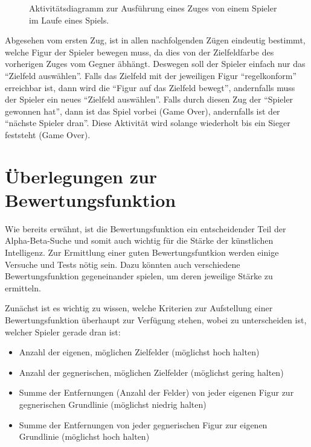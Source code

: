 \documentclass[
	12pt,
	halfparskip,
	a4paper,
	abstract,
	bibliography=totoc,
	liststotoc
]{scrreprt}
\begin{document}
\begin{figure}[htb]
\begin{center}
\end{center}
\caption{Aktivitätsdiagramm zur Ausführung eines Zuges von einem Spieler im Laufe eines Spiels.}
\label{fig:aktiv}
\end{figure}

Abgesehen vom ersten Zug, ist in allen nachfolgenden Zügen eindeutig bestimmt, welche Figur der Spieler bewegen muss, da dies von der Zielfeldfarbe des vorherigen Zuges vom Gegner äbhängt. Deswegen soll der Spieler einfach nur das “Zielfeld auswählen”. Falls das Zielfeld mit der jeweiligen Figur “regelkonform” erreichbar ist, dann wird die “Figur auf das Zielfeld bewegt”, andernfalls muss der Spieler ein neues “Zielfeld auswählen”. Falls durch diesen Zug der “Spieler gewonnen hat”, dann ist das Spiel vorbei (Game Over), andernfalls ist der “nächste Spieler dran”. Diese Aktivität wird solange wiederholt bis ein Sieger feststeht (Game Over).

\section{Überlegungen zur Bewertungsfunktion}

Wie bereits erwähnt, ist die Bewertungsfunktion ein entscheidender Teil der Alpha-Beta-Suche und somit auch wichtig für die Stärke der künstlichen Intelligenz. Zur Ermittlung einer guten Bewertungsfuntkion werden einige Versuche und Tests nötig sein. Dazu könnten auch verschiedene Bewertungsfunktion gegeneinander spielen, um deren jeweilige Stärke zu ermitteln.

\begin{samepage}
Zunächst ist es wichtig zu wissen, welche Kriterien zur Aufstellung einer Bewertungsfunktion überhaupt zur Verfügung stehen, wobei zu unterscheiden ist, welcher Spieler gerade dran ist:
\begin{itemize}
\item Anzahl der eigenen, möglichen Zielfelder (möglichst hoch halten)
\item Anzahl der gegnerischen, möglichen Zielfelder (möglichst gering halten)
\item Summe der Entfernungen (Anzahl der Felder) von jeder eigenen Figur zur gegnerischen Grundlinie (möglichst niedrig halten)
\item Summe der Entfernungen von jeder gegnerischen Figur zur eigenen Grundlinie (möglichst hoch halten)
\end{itemize}
\end{samepage}
\end{document}
